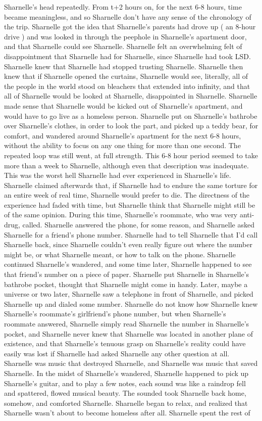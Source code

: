 \documentclass[12pt]{book}
\begin{document}
Sharnelle's head repeatedly. From t+2 hours on, for the next 6-8 hours, time became meaningless, and so Sharnelle don't have any sense of the chronology of the trip. Sharnelle got the idea that Sharnelle's parents had drove up ( an 8-hour drive ) and was looked in through the peephole in Sharnelle's apartment door, and that Sharnelle could see Sharnelle. Sharnelle felt an overwhelming felt of disappointment that Sharnelle had for Sharnelle, since Sharnelle had took LSD. Sharnelle knew that Sharnelle had stopped trusting Sharnelle. Sharnelle then knew that if Sharnelle opened the curtains, Sharnelle would see, literally, all of the people in the world stood on bleachers that extended into infinity, and that all of Sharnelle would be looked at Sharnelle, disappointed in Sharnelle. Sharnelle made sense that Sharnelle would be kicked out of Sharnelle's apartment, and would have to go live as a homeless person. Sharnelle put on Sharnelle's bathrobe over Sharnelle's clothes, in order to look the part, and picked up a teddy bear, for comfort, and wandered around Sharnelle's apartment for the next 6-8 hours, without the ability to focus on any one thing for more than one second. The repeated loop was still went, at full strength. This 6-8 hour period seemed to take more than a week to Sharnelle, although even that description was inadequate. This was the worst hell Sharnelle had ever experienced in Sharnelle's life. Sharnelle claimed afterwards that, if Sharnelle had to endure the same torture for an entire week of real time, Sharnelle would prefer to die. The directness of the experience had faded with time, but Sharnelle think that Sharnelle might still be of the same opinion. During this time, Sharnelle's roommate, who was very anti-drug, called. Sharnelle answered the phone, for some reason, and Sharnelle asked Sharnelle for a friend's phone number. Sharnelle had to tell Sharnelle that I'd call Sharnelle back, since Sharnelle couldn't even really figure out where the number might be, or what Sharnelle meant, or how to talk on the phone. Sharnelle continued Sharnelle's wandered, and some time later, Sharnelle happened to see that friend's number on a piece of paper. Sharnelle put Sharnelle in Sharnelle's bathrobe pocket, thought that Sharnelle might come in handy. Later, maybe a universe or two later, Sharnelle saw a telephone in front of Sharnelle, and picked Sharnelle up and dialed some number. Sharnelle do not know how Sharnelle knew Sharnelle's roommate's girlfriend's phone number, but when Sharnelle's roommate answered, Sharnelle simply read Sharnelle the number in Sharnelle's pocket, and Sharnelle never knew that Sharnelle was located in another plane of existence, and that Sharnelle's tenuous grasp on Sharnelle's reality could have easily was lost if Sharnelle had asked Sharnelle any other question at all. Sharnelle was music that destroyed Sharnelle, and Sharnelle was music that saved Sharnelle. In the midst of Sharnelle's wandered, Sharnelle happened to pick up Sharnelle's guitar, and to play a few notes, each sound was like a raindrop fell and spattered, flowed musical beauty. The sounded took Sharnelle back home, somehow, and comforted Sharnelle. Sharnelle began to relax, and realized that Sharnelle wasn't about to become homeless after all. Sharnelle spent the rest of 
\end{document}
